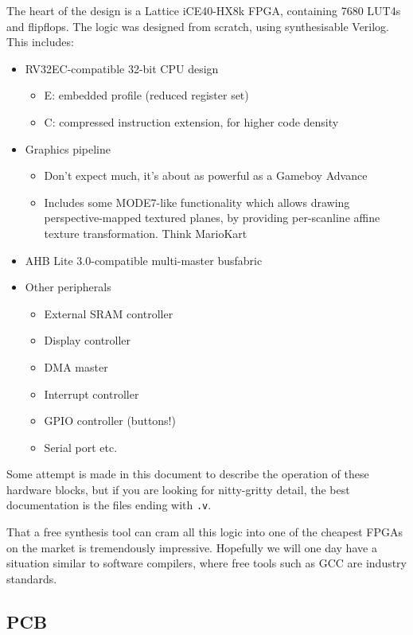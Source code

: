 \documentclass{article}
\begin{document}
The heart of the design is a Lattice iCE40-HX8k FPGA, containing 7680 LUT4s and flipflops. The logic was designed from scratch, using synthesisable Verilog. This includes:
\begin{itemize}
\item RV32EC-compatible 32-bit CPU design
	\begin{itemize}
	\item E: embedded profile (reduced register set)
	\item C: compressed instruction extension, for higher code density
	\end{itemize}
\item Graphics pipeline
	\begin{itemize}
	\item Don't expect much, it's about as powerful as a Gameboy Advance
	\item Includes some MODE7-like functionality which allows drawing perspective-mapped textured planes, by providing per-scanline affine texture transformation. Think MarioKart
	\end{itemize}
\item AHB Lite 3.0-compatible multi-master busfabric
\item Other peripherals
	\begin{itemize}
	\item External SRAM controller
	\item Display controller
	\item DMA master
	\item Interrupt controller
	\item GPIO controller (buttons!)
	\item Serial port etc.
	\end{itemize}
\end{itemize}

Some attempt is made in this document to describe the operation of these hardware blocks, but if you are looking for nitty-gritty detail, the best documentation is the files ending with \texttt{.v}.

That a free synthesis tool can cram all this logic into one of the cheapest FPGAs on the market is tremendously impressive. Hopefully we will one day have a situation similar to software compilers, where free tools such as GCC are industry standards.

\subsection{PCB}
\end{document}
